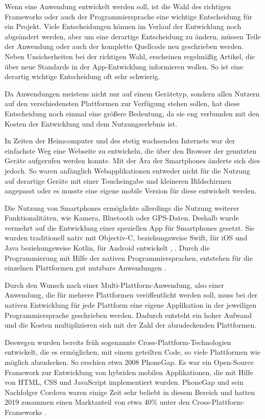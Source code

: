 Wenn eine Anwendung entwickelt werden soll, ist die Wahl des richtigen Frameworks oder auch der Programmiersprache eine wichtige Entscheidung für ein Projekt. Viele Entscheidungen können im Verlauf der Entwicklung noch abgeändert werden, aber um eine derartige Entscheidung zu ändern, müssen Teile der Anwendung oder auch der komplette Quellcode neu geschrieben werden. Neben Unsicherheiten bei der richtigen Wahl, erscheinen regelmäßig Artikel, die über neue Standards in der App-Entwicklung informieren wollen. So ist eine derartig wichtige Entscheidung oft sehr schwierig.

Da Anwendungen meistens nicht nur auf einem Gerätetyp, sondern allen Nutzern auf den verschiedensten Plattformen zur Verfügung stehen sollen, hat diese Entscheidung noch einmal eine größere Bedeutung, da sie eng verbunden mit den Kosten der Entwicklung und dem Nutzungserlebnis ist.

In Zeiten der Heimcomputer und des stetig wachsenden Internets war der einfachste Weg eine Webseite zu entwickeln, die über den Browser der genutzten Geräte aufgerufen werden konnte. Mit der Ära der Smartphones änderte sich dies jedoch. So waren anfänglich Webapplikationen entweder nicht für die Nutzung auf derartige Geräte mit einer Toucheingabe und kleineren Bildschirmen angepasst oder es musste eine eigene mobile Version für diese entwickelt werden\cite{Bryant2012}.

Die Nutzung von Smartphones ermöglichte allerdings die Nutzung weiterer Funktionalitäten, wie Kamera, Bluetooth oder GPS-Daten. Deshalb wurde vermehrt auf die Entwicklung einer speziellen App für Smartphones gesetzt. Sie wurden traditionell nativ mit Objectiv-C, beziehungsweise Swift, für iOS und Java beziehungsweise Kotlin, für Android entwickelt \cite{ELKASSAS2017163}, \cite{researchgate_thomas}. Durch die Programmierung mit Hilfe der nativen Programmiersprachen, entstehen für die einzelnen Plattformen gut nutzbare Anwendungen \cite{researchgate_thomas}.

Durch den Wunsch nach einer Multi-Plattform-Anwendung, also einer Anwendung, die für mehrere Plattformen veröffentlicht werden soll, muss bei der nativen Entwicklung für jede Plattform eine eigene Applikation in der jeweiligen Programmiersprache geschrieben werden. Dadurch entsteht ein hoher Aufwand und die Kosten multiplizieren sich mit der Zahl der abzudeckenden Plattformen.

Deswegen wurden bereits früh sogenannte Cross-Plattform-Technologien entwickelt, die es ermöglichen, mit einem geteilten Code, so viele Plattformen wie möglich abzudecken. So erschien etwa 2008 PhoneGap. Es war ein Open-Source Framework zur Entwicklung von hybriden mobilen Applikationen, die mit Hilfe von HTML, CSS und JavaScript implementiert wurden. PhoneGap und sein Nachfolger Cordova waren einige Zeit sehr beliebt in diesem Bereich und hatten 2019 zusammen einen Marktanteil von etwa 40\% unter den Cross-Plattform-Frameworks \cite{statist_CP_Framework}.

